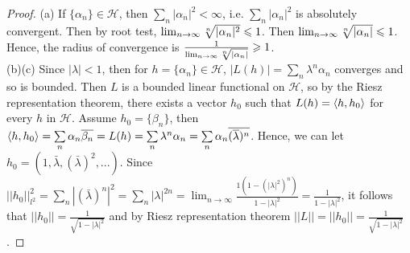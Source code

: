 \begin{proof}
    (a) If $\{\alpha_n\}\in\mathscr{H}$, then $\sum\limits_{n}|\alpha_n|^2<\infty$, i.e. 
    $\sum\limits_{n}|\alpha_n|^2$ is absolutely convergent. Then by root test, $\lim_{n\rightarrow \infty}\sqrt[n]{|\alpha_n|^2}\leqslant 1$.
    Then $\lim_{n\rightarrow \infty}\sqrt[n]{|\alpha_n|}\leqslant 1$. 
    Hence, the radius of convergence is $\frac{1}{\lim_{n\rightarrow \infty}\sqrt[n]{|\alpha_n|}}\geqslant 1$.
    \\
    (b)(c) Since $|\lambda|<1$, then for $h=\{\alpha_n\}\in \mathscr{H}$, $|L(h)|=\sum\limits_{n}\lambda^n \alpha_n$ converges and so is bounded.
    Then $L$ is a bounded linear functional on $\mathscr{H}$, so by the Riesz representation theorem,
    there exists a vector $h_0$ such that $L(h)=\langle h,h_0\rangle$ for every $h$ in $\mathscr{H}$.
    Assume $h_0=\{\beta_n\}$, then $\langle h,h_0\rangle=\sum\limits_{n}\alpha_n\overline{\beta_n}=L(h)=\sum\limits_{n}\lambda^n\alpha_n=\sum\limits_{n}\alpha_n\overline{(\overline{\lambda})^n}$.
    Hence, we can let $h_0=(1,\bar{\lambda}, (\bar{\lambda})^2,...)$. 
    Since $||h_0||_{l^2}^2=\sum\limits_{n}|(\bar{\lambda})^n|^2=\sum\limits_{n}|\lambda|^{2n}=\lim_{n\rightarrow \infty}\frac{1(1-(|\lambda|^2)^n)}{1-|\lambda|^2}=\frac{1}{1-|\lambda|^2}$,
    it follows that $||h_0||=\frac{1}{\sqrt{1-|\lambda|^2}}$ and by Riesz representation theorem $||L||=||h_0||=\frac{1}{\sqrt{1-|\lambda|^2}}$.
\end{proof}

